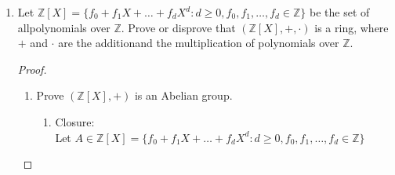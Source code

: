 \documentclass{article}
\theoremstyle{break}
\begin{document}
\begin{enumerate}
\begin{proof}
\begin{enumerate}
\begin{enumerate}
                                \item Asssociativity: $\forall (a,b) , (c,d), (e,f)\in \mathbb{Z}^2$, \\ $((a, b)\bigotimes(c, d) )\bigotimes (e,f)=(ac, bd) \bigotimes (e,f) = (ace, bdf) = (a,b) \bigotimes (ce, df)=(a, b)\bigotimes((c, d) \bigotimes (e,f))$
                        \end{enumerate}
                        \item Distributive Law: 
                        \begin{enumerate}
                                \item $\forall (a,b),(c,d),(e,f) \in \mathbb{Z}^2$, \\$(a,b) \bigotimes ((c,d) \bigoplus (e,f)) = (a,b) \bigotimes (c+e, d+f) = (ac +ae, bd+bf) \\= (ac,bd) \bigoplus (ae,bf) = ((a,b)\bigotimes(c,d) ) \bigoplus ((a,b) \bigotimes (e,f))$
                                \item $\forall (a,b),(c,d),(e,f) \in \mathbb{Z}^2$, \\ we have $((a,b)\bigoplus(c,d))\bigotimes(e,f) = ((a,b)\bigotimes(e,f) )\bigoplus ((c,d)\bigotimes (e,f))$\\
                                The proof is similiar
                        \end{enumerate}
                \end{enumerate}
        \end{proof}
        \newpage
        \item Let $\mathbb{Z}[X]  =\{f_0+f_1X+\dots+f_dX^d :d\geq 0, f_0, f_1, \dots , f_d \in \mathbb{Z}\}$ be  the  set  of  allpolynomials over $\mathbb{Z}$.  Prove or disprove that $(\mathbb{Z}[X],+,·)$ is a ring, where $+$ and $·$ are the additionand the multiplication of polynomials over $\mathbb{Z}$.
        \begin{proof}
                \leavevmode\\
                \begin{enumerate}
                        \item Prove $(\mathbb{Z}[X], +)$ is an Abelian group.
                        \begin{enumerate}
                                \item Closure: \\
                                Let $A \in \mathbb{Z}[X]  =\{f_0+f_1X+\dots+f_dX^d :d\geq 0, f_0, f_1, \dots , f_d \in \mathbb{Z}\}$\\

\end{enumerate}
\end{enumerate}
\end{proof}
\end{enumerate}
\end{document}
